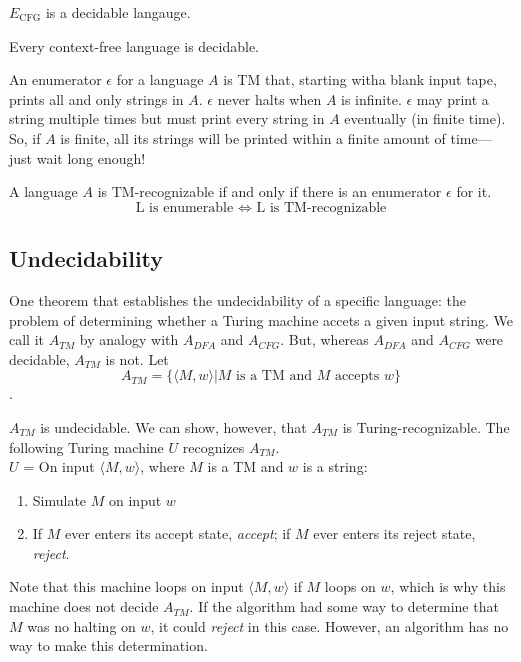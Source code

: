 \documentclass{article}
\begin{document}
\begin{theorem}
  $E_{\textrm{CFG}}$ is a decidable langauge. 
\end{theorem}

\begin{theorem}
  Every context-free language is decidable. 
\end{theorem}

\begin{definition}
  An enumerator $\epsilon$ for a language $A$ is TM that, starting witha  blank input tape, prints all and only strings in $A$. $\epsilon$ never halts when $A$ is infinite. $\epsilon$ may print a string multiple times but must print every string in $A$ eventually (in finite time). So, if $A$ is finite, all its strings will be printed within a finite amount of time---just wait long enough!
\end{definition}

\begin{theorem}
  A language $A$ is TM-recognizable if and only if there is an enumerator $\epsilon$ for it. $$\textrm{L is enumerable } \Leftrightarrow \textrm{ L is TM-recognizable}$$
\end{theorem}

\subsection{Undecidability}

One theorem that establishes the undecidability of a specific language: the problem of determining whether a Turing machine accets a given input string. We call it $A_{TM}$ by analogy with $A_{DFA}$ and $A_{CFG}$. But, whereas $A_{DFA}$ and $A_{CFG}$ were decidable, $A_{TM}$ is not. Let $$A_{TM} = \{ \langle M,w \rangle | M \textrm{ is a TM and } M \textrm{ accepts } w\}$$. 

\begin{theorem}
  $A_{TM}$ is undecidable. We can show, however, that $A_{TM}$ is Turing-recognizable. The following Turing machine $U$ recognizes $A_{TM}$. \\ 
  $U$  = On input $\langle M,w \rangle$, where $M$ is a TM and $w$ is a string: 
  \begin{enumerate}
    \item Simulate $M$ on input $w$ 
    \item If $M$ ever enters its accept state, \emph{accept}; if $M$ ever enters its reject state, \emph{reject}. 
  \end{enumerate}
  Note that this machine loops on input $\langle M,w \rangle$ if $M$ loops on $w$, which is why this machine does not decide $A_{TM}$. If the algorithm had some way to determine that $M$ was no halting on $w$, it could \emph{reject} in this case. However, an algorithm has no way to make this determination. 
\end{theorem}
\end{document}
